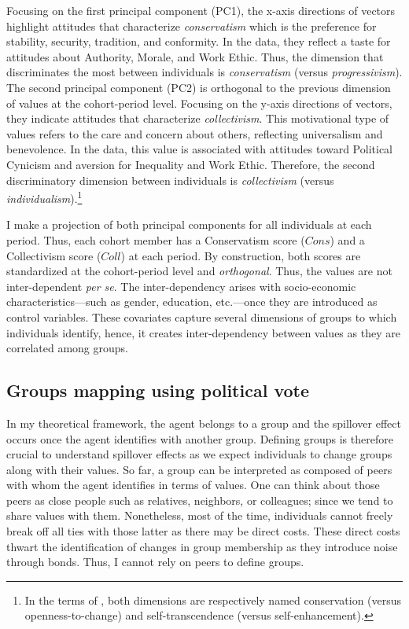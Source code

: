 Focusing on the first principal component (PC1), the x-axis directions of vectors highlight attitudes that characterize \textit{conservatism} which is the preference for stability, security, tradition, and conformity. In the data, they reflect a taste for attitudes about Authority, Morale, and Work Ethic. Thus, the dimension that discriminates the most between individuals is \textit{conservatism} (versus \textit{progressivism}).
The second principal component (PC2) is orthogonal to the previous dimension of values at the cohort-period level. Focusing on the y-axis directions of vectors, they indicate attitudes that characterize \textit{collectivism}. This motivational type of values refers to the care and concern about others, reflecting universalism and benevolence. In the data, this value is associated with attitudes toward Political Cynicism and aversion for Inequality and Work Ethic. Therefore, the second discriminatory dimension between individuals is \textit{collectivism} (versus \textit{individualism}).\footnote{In the terms of \citet{Schwartz1992Universals}, both dimensions are respectively named conservation (versus openness-to-change) and self-transcendence (versus self-enhancement).}

I make a projection of both principal components for all individuals at each period.  Thus, each cohort member has a Conservatism score ($Cons$) and a Collectivism score ($Coll$) at each period. By construction, both scores are standardized at the cohort-period level and \textit{orthogonal}. Thus, the values are not inter-dependent \textit{per se}. The inter-dependency arises with socio-economic characteristics---such as gender, education, etc.---once they are introduced as control variables. These covariates capture several dimensions of groups to which individuals identify, hence, it creates inter-dependency between values as they are correlated among groups.

\subsection{Groups mapping using political vote}

In my theoretical framework, the agent belongs to a group and the spillover effect occurs once the agent identifies with another group. Defining groups is therefore crucial to understand spillover effects as we expect individuals to change groups along with their values. So far, a group can be interpreted as composed of peers with whom the agent identifies in terms of values. One can think about those peers as close people such as relatives, neighbors, or colleagues; since we tend to share values with them. Nonetheless, most of the time, individuals cannot freely break off all ties with those latter as there may be direct costs. These direct costs thwart the identification of changes in group membership as they introduce noise through bonds. Thus, I cannot rely on peers to define groups.

